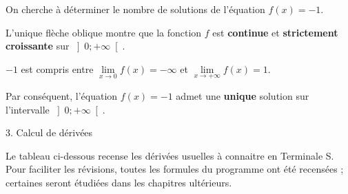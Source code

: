 {\begin{center}
\begin{extern}
\begin{center}
               \end{center}
          \end{extern}
     \end{center}
     On cherche à déterminer le nombre de solutions de l'équation $f\left(x\right)=-1$.
     \par
     L'unique flèche oblique montre que la fonction $f$ est \textbf{continue} et \textbf{strictement croissante} sur $\left]0;+\infty \right[$.
     \par
     $-1$ est compris entre $\lim\limits_{x\rightarrow 0}f\left(x\right)=-\infty $ et  $\lim\limits_{x\rightarrow +\infty }f\left(x\right)=1$.
     \par
     Par conséquent, l'équation $f\left(x\right)=-1$ admet une \textbf{unique} solution sur l'intervalle  $\left]0 ; +\infty \right[$.
}
\begin{h2}3. Calcul de dérivées\end{h2}
Le tableau ci-dessous recense les dérivées usuelles à connaitre en Terminale S. Pour faciliter les révisions, toutes les formules du programme ont été recensées ; certaines seront étudiées dans les chapitres ultérieurs.
